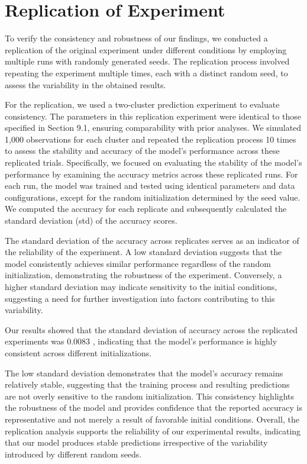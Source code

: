 \documentclass{article}
\begin{document}
\clearpage

\section{Replication of Experiment}

To verify the consistency and robustness of our findings, we conducted a replication of the original experiment under different conditions by employing multiple runs with randomly generated seeds. The replication process involved repeating the experiment multiple times, each with a distinct random seed, to assess the variability in the obtained results.

For the replication, we used a two-cluster prediction experiment to evaluate consistency. The parameters in this replication experiment were identical to those specified in Section 9.1, ensuring comparability with prior analyses. We simulated 1,000 observations for each cluster and repeated the replication process 10 times to assess the stability and accuracy of the model's performance across these replicated trials.
Specifically, we focused on evaluating the stability of the model's performance by examining the accuracy metrics across these replicated runs. For each run, the model was trained and tested using identical parameters and data configurations, except for the random initialization determined by the seed value. We computed the accuracy for each replicate and subsequently calculated the standard deviation (std) of the accuracy scores.

The standard deviation of the accuracy across replicates serves as an indicator of the reliability of the experiment. A low standard deviation suggests that the model consistently achieves similar performance regardless of the random initialization, demonstrating the robustness of the experiment. Conversely, a higher standard deviation may indicate sensitivity to the initial conditions, suggesting a need for further investigation into factors contributing to this variability.

Our results showed that the standard deviation of accuracy across the replicated experiments was 
0.0083
, indicating that the model’s performance is highly consistent across different initializations.

The low standard deviation demonstrates that the model’s accuracy remains relatively stable, suggesting
that the training process and resulting predictions are not overly sensitive to the random initialization. 
This consistency highlights the robustness of the model and provides confidence that the
reported accuracy is representative and not merely a result of favorable initial conditions.
Overall, the replication analysis supports the reliability of our experimental results, indicating that our
model produces stable predictions irrespective of the variability introduced by different random seeds.
\end{document}
